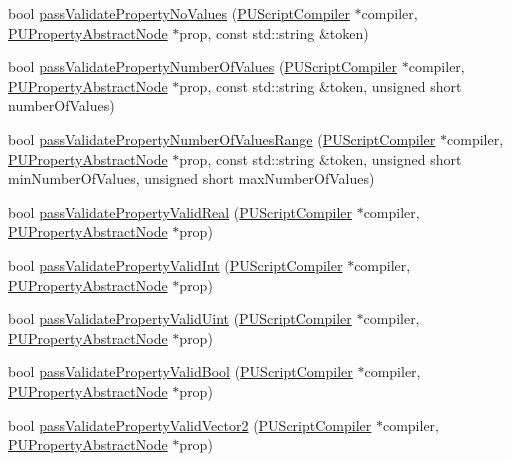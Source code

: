 \begin{DoxyCompactItemize}
\item 
bool \hyperlink{classPUScriptTranslator_a34528983a36a1a977b597354fd2e1db3}{pass\+Validate\+Property\+No\+Values} (\hyperlink{classPUScriptCompiler}{P\+U\+Script\+Compiler} $\ast$compiler, \hyperlink{classPUPropertyAbstractNode}{P\+U\+Property\+Abstract\+Node} $\ast$prop, const std\+::string \&token)
\item 
bool \hyperlink{classPUScriptTranslator_aef77b0acaa2bc43fb6d59eb4f4484e72}{pass\+Validate\+Property\+Number\+Of\+Values} (\hyperlink{classPUScriptCompiler}{P\+U\+Script\+Compiler} $\ast$compiler, \hyperlink{classPUPropertyAbstractNode}{P\+U\+Property\+Abstract\+Node} $\ast$prop, const std\+::string \&token, unsigned short number\+Of\+Values)
\item 
bool \hyperlink{classPUScriptTranslator_a77fa0b5d20667fefead670428400026b}{pass\+Validate\+Property\+Number\+Of\+Values\+Range} (\hyperlink{classPUScriptCompiler}{P\+U\+Script\+Compiler} $\ast$compiler, \hyperlink{classPUPropertyAbstractNode}{P\+U\+Property\+Abstract\+Node} $\ast$prop, const std\+::string \&token, unsigned short min\+Number\+Of\+Values, unsigned short max\+Number\+Of\+Values)
\item 
bool \hyperlink{classPUScriptTranslator_a58b9dca1f92b31f3f881bacce1cab684}{pass\+Validate\+Property\+Valid\+Real} (\hyperlink{classPUScriptCompiler}{P\+U\+Script\+Compiler} $\ast$compiler, \hyperlink{classPUPropertyAbstractNode}{P\+U\+Property\+Abstract\+Node} $\ast$prop)
\item 
bool \hyperlink{classPUScriptTranslator_a14d7f09cb01010236a774569c20c07fa}{pass\+Validate\+Property\+Valid\+Int} (\hyperlink{classPUScriptCompiler}{P\+U\+Script\+Compiler} $\ast$compiler, \hyperlink{classPUPropertyAbstractNode}{P\+U\+Property\+Abstract\+Node} $\ast$prop)
\item 
bool \hyperlink{classPUScriptTranslator_a3f49e03627517ef0e633f90c7c775f54}{pass\+Validate\+Property\+Valid\+Uint} (\hyperlink{classPUScriptCompiler}{P\+U\+Script\+Compiler} $\ast$compiler, \hyperlink{classPUPropertyAbstractNode}{P\+U\+Property\+Abstract\+Node} $\ast$prop)
\item 
bool \hyperlink{classPUScriptTranslator_ac14e053124729ee15b9eb6ecddce28ac}{pass\+Validate\+Property\+Valid\+Bool} (\hyperlink{classPUScriptCompiler}{P\+U\+Script\+Compiler} $\ast$compiler, \hyperlink{classPUPropertyAbstractNode}{P\+U\+Property\+Abstract\+Node} $\ast$prop)
\item 
bool \hyperlink{classPUScriptTranslator_ae4a91c272452a2ca3b2b0c814132d1ec}{pass\+Validate\+Property\+Valid\+Vector2} (\hyperlink{classPUScriptCompiler}{P\+U\+Script\+Compiler} $\ast$compiler, \hyperlink{classPUPropertyAbstractNode}{P\+U\+Property\+Abstract\+Node} $\ast$prop)

\end{DoxyCompactItemize}
